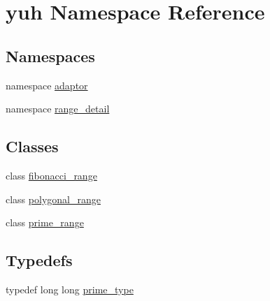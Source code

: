 \hypertarget{namespaceyuh}{\section{yuh \-Namespace \-Reference}
\label{d5/d2b/namespaceyuh}
}
\subsection*{\-Namespaces}
\begin{DoxyCompactItemize}
\item 
namespace \hyperlink{namespaceyuh_1_1adaptor}{adaptor}
\item 
namespace \hyperlink{namespaceyuh_1_1range__detail}{range\-\_\-detail}
\end{DoxyCompactItemize}
\subsection*{\-Classes}
\begin{DoxyCompactItemize}
\item 
class \hyperlink{classyuh_1_1fibonacci__range}{fibonacci\-\_\-range}
\item 
class \hyperlink{classyuh_1_1polygonal__range}{polygonal\-\_\-range}
\item 
class \hyperlink{classyuh_1_1prime__range}{prime\-\_\-range}
\end{DoxyCompactItemize}
\subsection*{\-Typedefs}
\begin{DoxyCompactItemize}
\item 
typedef long long \hyperlink{namespaceyuh_af542f8440602da42322ddb7ea8242336}{prime\-\_\-type}
\end{DoxyCompactItemize}
